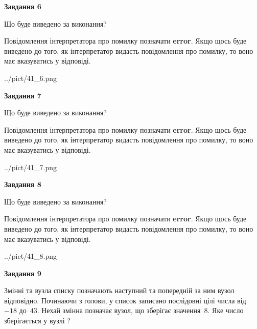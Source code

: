 \documentclass[12pt, ukrainian]{article}
\begin{document}
{\begin {large}
{\begin {center}\textbf{Завдання 6}\end {center}}\par
Що буде виведено за виконання?

Повідомлення інтерпретатора про помилку позначати \textbf{error}.
Якщо щось буде виведено до того, як інтерпретатор видасть повідомлення про помилку, 
то воно має вказуватись у відповіді. \par


\begin{center}
	{../pict/41_6.png}
\end{center}
\newpage

{\begin {center}\textbf{Завдання 7}\end {center}}\par
Що буде виведено за виконання?

Повідомлення інтерпретатора про помилку позначати \textbf{error}.
Якщо щось буде виведено до того, як інтерпретатор видасть повідомлення про помилку, 
то воно має вказуватись у відповіді. \par


\begin{center}
	{../pict/41_7.png}
\end{center}
\newpage

{\begin {center}\textbf{Завдання 8}\end {center}}\par
Що буде виведено за виконання?

Повідомлення інтерпретатора про помилку позначати \textbf{error}.
Якщо щось буде виведено до того, як інтерпретатор видасть повідомлення про помилку, 
то воно має вказуватись у відповіді. \par


\begin{center}
	{../pict/41_8.png}
\end{center}
\newpage

{\begin {center}\textbf{Завдання 9}\end {center}}\par
Змінні  та  вузла списку позначають наступний та попередній за ним вузол відповідно. Починаючи з голови, у список записано послідовні цілі числа від~$-18$ до~$43$. Нехай змінна  позначає вузол, що зберігає значення~$8$.
Яке число зберігається у вузлі  ?\par
\newpage


\end{large}}
\end{document}
